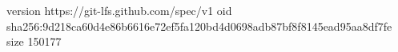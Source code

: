 version https://git-lfs.github.com/spec/v1
oid sha256:9d218ca60d4e86b6616e72ef5fa120bd4d0698adb87bf8f8145ead95aa8df7fe
size 150177
